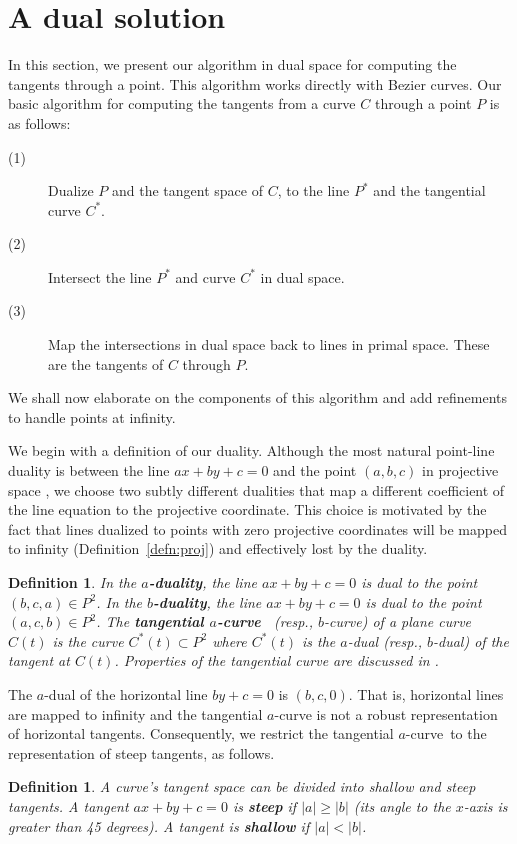 \documentclass[twocolumn,10pt]{article}
\newcommand{\atang}{tangential $a$-curve\ }
\newtheorem{defn2}[theorem]{Definition}
\begin{document}
\section{A dual solution}
\label{sec:point}

In this section, we present our algorithm in dual space
for computing the tangents through a point.
This algorithm works directly with Bezier curves.
Our basic algorithm for computing the tangents from a curve $C$ through
a point $P$ is as follows:
%
\begin{description}
\item[(1)]	Dualize $P$ and the tangent space of $C$, to the line $P^*$
		and the tangential curve $C^*$.
\item[(2)]	Intersect the line $P^*$ and curve $C^*$ in dual space.
\item[(3)]	Map the intersections in dual space back to lines in primal space.
		These are the tangents of $C$ through $P$.
\end{description}
%
We shall now elaborate on the components of this algorithm
and add refinements to handle points at infinity.

We begin with a definition of our duality.
Although the most natural point-line duality is between the line $ax+by+c=0$
and the point $(a,b,c)$ in projective space \cite{fulton69}, %
we choose two subtly different dualities
that map a different coefficient of the line equation to the projective coordinate.
This choice is motivated by the fact that lines dualized 
to points with zero projective coordinates
will be mapped to infinity (Definition~\ref{defn:proj}) and effectively lost by the duality.
%
\begin{defn2}
In the {\bf $a$-duality}, the line $ax+by+c=0$ is dual to the point $(b,c,a) \in P^2$.
In the {\bf $b$-duality}, the line $ax+by+c=0$ is dual to the point $(a,c,b) \in P^2$.
The {\bf \atang}  (resp., $b$-curve) of a plane curve $C(t)$
is the curve $C^*(t) \subset P^2$ where $C^*(t)$ is the $a$-dual
(resp., $b$-dual) of the tangent at $C(t)$.
Properties of the tangential curve are discussed in \cite{jj00}.
\end{defn2}

The $a$-dual of the horizontal line $by+c=0$ is $(b,c,0)$.
That is, horizontal lines are mapped to infinity
and the tangential $a$-curve is not a robust representation of horizontal tangents.
Consequently, we restrict the \atang to the representation of steep tangents, as follows.

\begin{defn2}
A curve's tangent space can be divided into shallow and steep tangents.
A tangent $ax+by+c=0$ is {\bf steep} if $|a| \geq |b|$
(its angle to the $x$-axis is greater than 45 degrees).
A tangent is {\bf shallow} if $|a| < |b|$.
\end{defn2}
\end{document}
